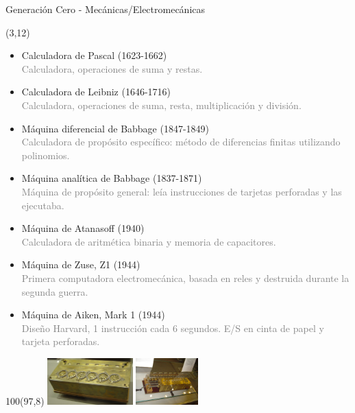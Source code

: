 \documentclass[aspectratio=169]{beamer}
\begin{document}
\begin{frame}[fragile,t]{Generación Cero - Mecánicas/Electromecánicas}
    \begin{textblock}{80}(3,12)
    \begin{itemize}
    \setlength\itemsep{0.1cm}
    \scriptsize
    \item<1-> \small Calculadora de Pascal (1623-1662)\\
    \scriptsize \textcolor{gray}{Calculadora, operaciones de suma y restas.} %
    \item<1-> \small Calculadora de Leibniz (1646-1716)\\ 
    \scriptsize \textcolor{gray}{Calculadora, operaciones de suma, resta, multiplicación y división.} %
    \item<2-> \small Máquina diferencial de Babbage (1847-1849)\\
    \scriptsize \textcolor{gray}{Calculadora de propósito específico: método de diferencias finitas utilizando polinomios.}
    \item<2-> \small Máquina analítica de Babbage (1837-1871)\\
    \scriptsize \textcolor{gray}{Máquina de propósito general: leía instrucciones de tarjetas perforadas y las ejecutaba.}
    \item<3-> \small Máquina de Atanasoff (1940)\\
    \scriptsize \textcolor{gray}{Calculadora de aritmética binaria y memoria de capacitores.}
    \item<3-> \small Máquina de Zuse, Z1 (1944)\\
    \scriptsize \textcolor{gray}{Primera computadora electromecánica, basada en reles y destruida durante la segunda guerra.}
    \item<3-> \small Máquina de Aiken, Mark 1 (1944)\\
    \scriptsize \textcolor{gray}{Diseño Harvard, 1 instrucción cada 6 segundos. E/S en cinta de papel y tarjeta perforadas.}
    \end{itemize}
    \end{textblock}
    \begin{textblock}{100}(97,8)
    \includegraphics[height=1.8cm]{img/Pascaline.jpg} \hspace{0.1cm} \includegraphics[height=1.8cm]{img/Leibnitzrechenmaschine.jpg}\\

\end{textblock}
\end{frame}
\end{document}
